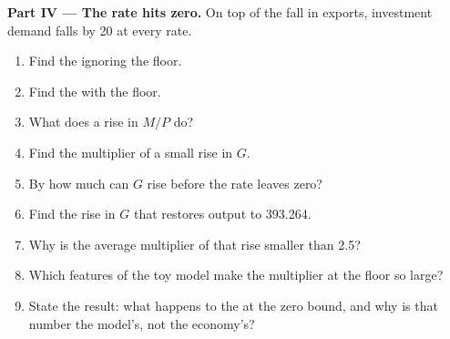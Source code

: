 \begin{problem}
\medskip\noindent\textbf{Part IV --- The rate hits zero.} On top of the fall in
exports, investment demand falls by 20 at every rate.
\begin{enumerate}[resume]
  \item Find the  ignoring the floor.
  \item Find the  with the floor.
  \item What does a rise in $M/P$ do?
  \item Find the multiplier of a small rise in $G$.
  \item By how much can $G$ rise before the rate leaves zero?
  \item Find the rise in $G$ that restores output to 393.264.
  \item Why is the average multiplier of that rise smaller than 2.5?
  \item Which features of the toy model make the multiplier at the floor so large?
  \item State the result: what happens to the  at the zero bound, and why is that number the model's, not the economy's?
\end{enumerate}
\end{problem}

